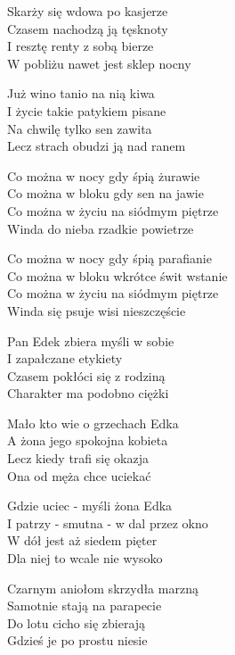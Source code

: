\begin{text}
    Skarży się wdowa po kasjerze\\
    Czasem nachodzą ją tęsknoty\\
    I resztę renty z sobą bierze\\
    W pobliżu nawet jest sklep nocny

    Już wino tanio na nią kiwa\\
    I życie takie patykiem pisane\\
    Na chwilę tylko sen zawita\\
    Lecz strach obudzi ją nad ranem

    \vin Co można w nocy gdy śpią żurawie\\
    \vin Co można w bloku gdy sen na jawie\\
    \vin Co można w życiu  na siódmym piętrze\\
    \vin Winda do nieba rzadkie powietrze

    \vin Co można w nocy gdy śpią parafianie\\
    \vin Co można w bloku wkrótce świt wstanie\\
    \vin Co można w życiu na siódmym piętrze\\
    \vin Winda się psuje wisi nieszczęście

    Pan Edek zbiera myśli w sobie\\
    I zapałczane etykiety\\
    Czasem pokłóci się z rodziną\\
    Charakter ma podobno ciężki

    Mało kto wie o grzechach Edka\\
    A żona jego spokojna kobieta\\
    Lecz kiedy trafi się okazja\\
    Ona od męża chce uciekać

    Gdzie uciec - myśli żona Edka\\
    I patrzy - smutna - w dal przez okno\\
    W dół jest aż siedem pięter\\
    Dla niej to wcale nie wysoko

    Czarnym aniołom skrzydła marzną\\
    Samotnie stają na parapecie\\
    Do lotu cicho się zbierają\\
    Gdzieś je po prostu niesie
\end{text}

